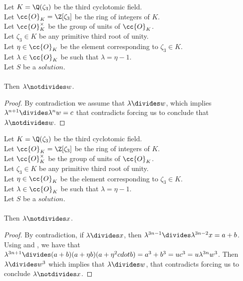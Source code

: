 \begin{lemma}
  \label{lmm:lambda_not_dvd_w}
  \leanok
  Let $K = \Q(\zeta_3)$ be the third cyclotomic field. \\
  Let $\cc{O}_K = \Z[\zeta_3]$ be the ring of integers of $K$. \\
  Let $\cc{O}^\times_K$ be the group of units of $\cc{O}_K$. \\
  Let $\zeta_3 \in K$ be any primitive third root of unity. \\
  Let $\eta \in \cc{O}_K$ be the element corresponding to $\zeta_3 \in K$. \\
  Let $\lambda \in \cc{O}_K$ be such that $\lambda = \eta -1$. \\
  Let $S$ be a $solution$.\\\\
  Then $\lambda \notdivides w$.
\end{lemma}
\begin{proof}
  \leanok
  By contradiction we assume that $\lambda \divides w$, which implies
  $\lambda^{n+1} \divides \lambda^n  w = c$ that contradicts 
  forcing us to conclude that $\lambda \notdivides w$.
\end{proof}

\begin{lemma}
  \label{lmm:lambda_not_dvd_x}
  \leanok
  Let $K = \Q(\zeta_3)$ be the third cyclotomic field. \\
  Let $\cc{O}_K = \Z[\zeta_3]$ be the ring of integers of $K$. \\
  Let $\cc{O}^\times_K$ be the group of units of $\cc{O}_K$. \\
  Let $\zeta_3 \in K$ be any primitive third root of unity. \\
  Let $\eta \in \cc{O}_K$ be the element corresponding to $\zeta_3 \in K$. \\
  Let $\lambda \in \cc{O}_K$ be such that $\lambda = \eta -1$. \\
  Let $S$ be a $solution$.\\\\
  Then $\lambda \notdivides x$.
\end{lemma}
\begin{proof}
  \leanok
  By contradiction, if $\lambda \divides x$, then
  $\lambda^{3n-1} \divides \lambda^{3n-2}  x = a+b$. Using 
  and , we have that $\lambda^{3n+1} \divides
  (a+b)  (a + \eta  b)  (a + \eta^2 cdot b) = a^3+b^3
  = u c^3 = u \lambda^{3n} w^3$.
  Then $\lambda \divides w^3$ which implies that $\lambda \divides w$, that
  contradicts  forcing us to conclude $\lambda \notdivides x$.
\end{proof}

